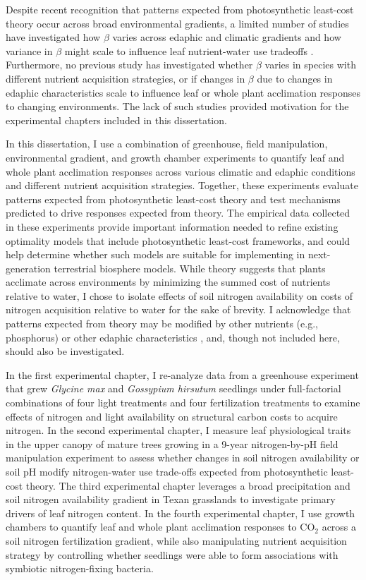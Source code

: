 Despite recent recognition that patterns expected from photosynthetic least-cost theory occur across broad environmental gradients, a limited number of studies have investigated how $\beta$ varies across edaphic and climatic gradients and how variance in $\beta$ might scale to influence leaf nutrient-water use tradeoffs . Furthermore, no previous study has investigated whether $\beta$ varies in species with different nutrient acquisition strategies, or if changes in $\beta$ due to changes in edaphic characteristics scale to influence leaf or whole plant acclimation responses to changing environments. The lack of such studies provided motivation for the experimental chapters included in this dissertation.

In this dissertation, I use a combination of greenhouse, field manipulation, environmental gradient, and growth chamber experiments to quantify leaf and whole plant acclimation responses across various climatic and edaphic conditions and different nutrient acquisition strategies. Together, these experiments evaluate patterns expected from photosynthetic least-cost theory and test mechanisms predicted to drive responses expected from theory. The empirical data collected in these experiments provide important information needed to refine existing optimality models that include photosynthetic least-cost frameworks, and could help determine whether such models are suitable for implementing in next-generation terrestrial biosphere models. While theory suggests that plants acclimate across environments by minimizing the summed cost of nutrients relative to water, I chose to isolate effects of soil nitrogen availability on costs of nitrogen acquisition relative to water for the sake of brevity. I acknowledge that patterns expected from theory may be modified by other nutrients (e.g., phosphorus) or other edaphic characteristics , and, though not included here, should also be investigated.

In the first experimental chapter, I re-analyze data from a greenhouse experiment that grew \textit{Glycine max} and \textit{Gossypium hirsutum} seedlings under full-factorial combinations of four light treatments and four fertilization treatments to examine effects of nitrogen and light availability on structural carbon costs to acquire nitrogen. In the second experimental chapter, I measure leaf physiological traits in the upper canopy of mature trees growing in a 9-year nitrogen-by-pH field manipulation experiment to assess whether changes in soil nitrogen availability or soil pH modify nitrogen-water use trade-offs expected from photosynthetic least-cost theory. The third experimental chapter leverages a broad precipitation and soil nitrogen availability gradient in Texan grasslands to investigate primary drivers of leaf nitrogen content. In the fourth experimental chapter, I use growth chambers to quantify leaf and whole plant acclimation responses to CO$_2$ across a soil nitrogen fertilization gradient, while also manipulating nutrient acquisition strategy by controlling whether seedlings were able to form associations with symbiotic nitrogen-fixing bacteria.

